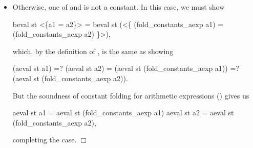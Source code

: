 \documentclass[12pt]{report}
\begin{document}
\begin{itemize}
       as required.



\item  Otherwise, one of   and
         is not a constant.  In this case, we
       must show


           beval st <\{a1 = a2\}>
         = beval st (<\{ (fold\_constants\_aexp a1) =
                         (fold\_constants\_aexp a2) \}>),


       which, by the definition of , is the same as showing


           (aeval st a1) =? (aeval st a2)
         = (aeval st (fold\_constants\_aexp a1)) =?
                   (aeval st (fold\_constants\_aexp a2)).


       But the soundness of constant folding for arithmetic
       expressions () gives us


         aeval st a1 = aeval st (fold\_constants\_aexp a1)
         aeval st a2 = aeval st (fold\_constants\_aexp a2),


       completing the case.  \ensuremath{\Box} 

\end{itemize}
\end{document}
